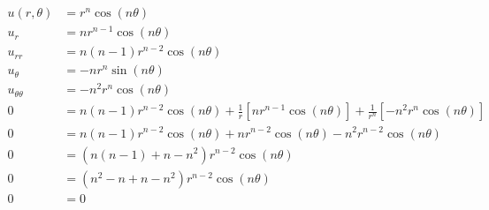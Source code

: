 \documentclass[../../HW07.tex]{subfiles}
\begin{document}
\begin{align*}
    u(r,\theta)      & = r^{n}\cos(n\theta)                                                                                                                    \\
    u_{r}            & =nr^{n-1}\cos(n\theta)                                                                                                                  \\
    u_{rr}           & =n(n-1)r^{n-2}\cos(n\theta)                                                                                                             \\
    u_{\theta}       & =-nr^{n}\sin(n\theta)                                                                                                                   \\
    u_{\theta\theta} & =-n^{2}r^{n}\cos(n\theta)                                                                                                               \\
    0                & = n(n-1)r^{n-2}\cos(n\theta) + \frac{1}{r}\left[ nr^{n-1}\cos(n\theta) \right] + \frac{1}{r^{n}}\left[ -n^{2}r^{n}\cos(n\theta) \right] \\
    0                & = n(n-1)r^{n-2}\cos(n\theta) + nr^{n-2}\cos(n\theta) - n^{2}r^{n-2}\cos(n\theta)                                                        \\
    0                & = \left( n(n-1) + n - n^{2} \right)r^{n-2}\cos(n\theta)                                                                                 \\
    0                & = \left( n^{2} - n + n - n^{2} \right)r^{n-2}\cos(n\theta)                                                                              \\
    0                & = 0
\end{align*}
\end{document}
